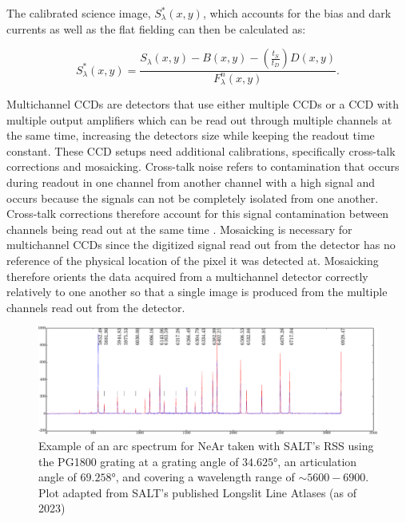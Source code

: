 The calibrated science image, $S^{*}_{\lambda}(x,y)$, which accounts for the bias and dark currents as well as the flat fielding can then be calculated as:

\begin{equation}
  S^{*}_{\lambda}(x,y) = \frac{S_{\lambda}(x,y) - B(x,y) - (\frac{t_{S}}{t_{D}})D(x,y)}{F^{n}_{\lambda}(x,y)}.
  \label{eq:science_cal}
\end{equation}

Multichannel \glspl{CCD} are detectors that use either multiple \glspl{CCD} or a \gls{CCD} with multiple output amplifiers which can be read out through multiple channels at the same time, increasing the detectors size while keeping the readout time constant. These \gls{CCD} setups need additional calibrations, specifically cross-talk corrections and mosaicking. Cross-talk noise refers to contamination that occurs during readout in one channel from another channel with a high signal and occurs because the signals can not be completely isolated from one another. Cross-talk corrections therefore account for this signal contamination between channels being read out at the same time \citep{CrossTalk}. Mosaicking is necessary for multichannel \glspl{CCD} since the digitized signal read out from the detector has no reference of the physical location of the pixel it was detected at. Mosaicking therefore orients the data acquired from a multichannel detector correctly relatively to one another so that a single image is produced from the multiple channels read out from the detector.

\begin{figure}[t]
  \centering
  \includegraphics[width = 16cm]{figures/2_Ne_arc.pdf}
  \caption{Example of an arc spectrum for NeAr taken with \gls{SALT}'s \gls{RSS} using the PG1800 grating at a grating angle of $34.625$°, an articulation angle of $69.258$°, and covering a wavelength range of $\sim5600 - 6900$\angstrom. Plot adapted from \gls{SALT}'s published Longslit Line Atlases (as of 2023)\protect\footnotemark}
  \label{fig:Ne_arc}
\end{figure}

